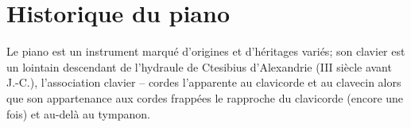 \cleardoublepage
{}
\clearscrheadfoot


\cleardoublepage

\clearscrheadfoot
\clearscrheadfoot
\renewcommand{\headfont}{\normalfont\rmfamily\scshape}
\setheadsepline[17cm]{0.4pt}
\setfootsepline[17cm]{0.4pt}
\cfoot{-- \pagemark{} --}

\section*{Historique du piano}

Le piano est un instrument marqué d'origines et d'héritages variés; son clavier est un lointain descendant de l'hydraule de Ctesibius d'Alexandrie (III\ieme{} siècle avant J.-C.), l'association clavier -- cordes  l'apparente au clavicorde et au clavecin alors que son appartenance aux cordes frappées le rapproche du clavicorde (encore une fois) et au-delà au tympanon.

